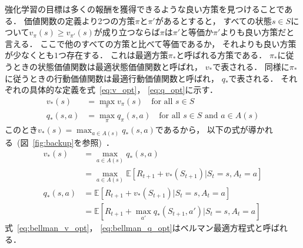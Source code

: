 強化学習の目標は多くの報酬を獲得できるような良い方策を見つけることである．
価値関数の定義より2つの方策$\pi$と$\pi'$があるとすると， すべての状態$s \in S$について$v_\pi(s) \geq v_{\pi'}(s)$が成り立つならば$\pi$は$\pi'$と等価か$\pi'$よりも良い方策だと言える．
ここで他のすべての方策と比べて等価であるか， それよりも良い方策が少なくとも$1$つ存在する．
これは最適方策$\pi_*$と呼ばれる方策である．
$\pi_*$に従うときの状態価値関数は最適状態価値関数と呼ばれ， $v_*$で表される．
同様に$\pi_*$に従うときの行動価値関数は最適行動価値関数と呼ばれ， $q_*$で表される．
それぞれの具体的な定義を式~\ref{eq:v_opt}， \ref{eq:q_opt}に示す．
\begin{align}
  \label{eq:v_opt}
  v_*(s) &= \max_\pi v_{\pi}(s) \quad \text{for all } s \in S \\
  \label{eq:q_opt}
  q_*(s,a) &= \max_\pi q_{\pi}(s, a) \quad \text{for all } s \in S \text{ and } a \in A(s)
\end{align}
このとき$v_*(s) = \max_{a \in A(s)} q_*(s, a)$であるから， 以下の式が導かれる~(図~\ref{fig:backup}を参照)~．
\begin{align}
  v_*(s) &= \max_{a \in A(s)} q_*(s, a) \\
  \label{eq:bellman_v_opt}
               &= \max_{a \in A(s)} \mathbb{E}[R_{t+1} + v_*(S_{t+1}) | S_t=s, A_t=a] \\
  q_*(s, a) &= \mathbb{E}[R_{t+1} + v_*(S_{t+1}) | S_t=s, A_t=a] \\
  \label{eq:bellman_q_opt}
                  &= \mathbb{E}[R_{t+1} + \max_{a'} q_*(S_{t+1}, a') | S_t=s, A_t=a]
\end{align}
式~\ref{eq:bellman_v_opt}， \ref{eq:bellman_q_opt}はベルマン最適方程式と呼ばれる．
